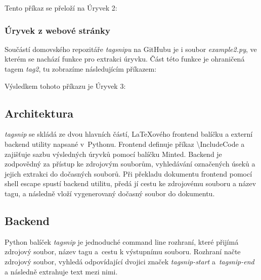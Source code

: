 \documentclass{article}
\begin{document}

Tento příkaz se přeloží na Úryvek 2:


\newpage

\subsubsection*{Úryvek z webové stránky}

Součástí domovského repozitáře \textit{tagsnipu} na GitHubu je i soubor \textit{example2.py}, 
ve kterém se nachází funkce pro extrakci úryvku. Část této funkce je ohraničená tagem \textit{tag2}, 
tu zobrazíme následujícím příkazem:


Výsledkem tohoto příkazu je Úryvek 3:


\subsection*{Architektura}

\textit{tagsnip} se skládá ze dvou hlavních částí,
La\TeX{}ového frontend balíčku a externí backend utility napsané v~Pythonu.
Frontend definuje příkaz \textbackslash{}IncludeCode a zajišťuje sazbu výsledných úryvků pomocí balíčku Minted.
Backend je zodpovědný za přístup ke zdrojovým souborům, vyhledávání označených úseků a jejich extrakci do dočasných souborů.
Při překladu dokumentu frontend pomocí shell escape spustí backend utilitu,
předá jí cestu ke zdrojovému souboru a název tagu,
a následně vloží vygenerovaný dočasný soubor do dokumentu.

\subsection*{Backend}

Python balíček \textit{tagsnip} je jednoduché command line rozhraní,
které přijímá zdrojový soubor, název tagu a~cestu k výstupnímu souboru. 
Rozhraní načte zdrojový soubor, vyhledá odpovídající dvojici značek
\textit{tagsnip-start} a~\textit{tagsnip-end} a následně extrahuje text mezi nimi.
\end{document}
